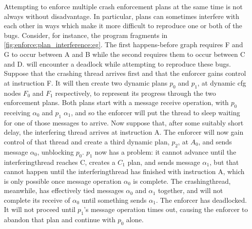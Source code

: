 Attempting to enforce multiple crash enforcement plans at the same
time is not always without disadvantage.  In particular, plans can
sometimes interfere with each other in ways which make it more
difficult to reproduce one or both of the bugs.  Consider, for
instance, the program fragments in
\autoref{fig:enforce:plan_interference:eg}.  The first happens-before
graph requires F and G to occur between A and B while the second
requires them to occur between C and D.  {\Technique} will encounter a
deadlock while attempting to reproduce these bugs.  Suppose that the
crashing thread arrives first and that the enforcer gains control at
instruction F.  It will then create two dynamic plans $p_0$ and $p_1$,
at dynamic \gls{cfg} nodes $F_0$ and $F_1$ respectively, to represent
its progress through the two enforcement plans.  Both plans start with
a message receive operation, with $p_0$ receiving $\alpha_0$ and $p_1$
$\alpha_1$, and so the enforcer will put the thread to sleep waiting
for one of those messages to arrive.  Now suppose that, after some
suitably short delay, the interfering thread arrives at instruction A.
The enforcer will now gain control of that thread and create a third
dynamic plan, $p_2$, at $A_0$, and sends message $\alpha_0$,
unblocking $p_0$.  $p_1$ now has a problem: it cannot advance until
the \gls{interferingthread} reaches C, creates a $C_1$ plan, and sends
message $\alpha_1$, but that cannot happen until the
\gls{interferingthread} has finished with instruction A, which is only
possible once message operation $\alpha_0$ is complete.  The
\gls{crashingthread}, meanwhile, has effectively tied messages
$\alpha_0$ and $\alpha_1$ together, and will not complete its receive
of $\alpha_0$ until something sends $\alpha_1$.  The enforcer has
deadlocked.  It will not proceed until $p_1$'s message operation times
out, causing the enforcer to abandon that plan and continue with $p_0$
alone.

